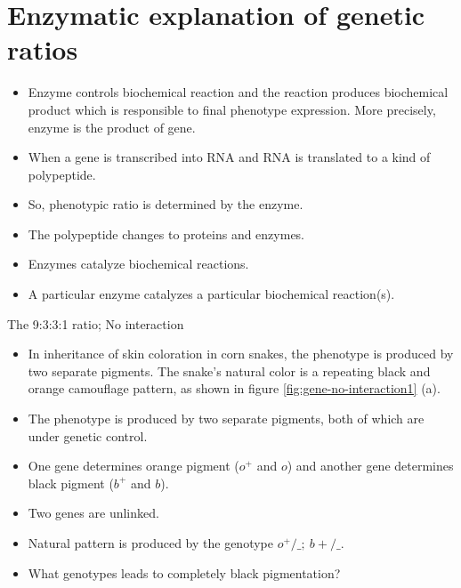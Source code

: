 \documentclass[11pt,dvipsnames,ignorenonframetext,aspectratio=169]{beamer}
\providecommand{\tightlist}{%
  \setlength{\itemsep}{0pt}\setlength{\parskip}{0pt}}
\begin{document}
\hypertarget{enzymatic-explanation-of-genetic-ratios}{%
\section{Enzymatic explanation of genetic
ratios}\label{enzymatic-explanation-of-genetic-ratios}}

\begin{frame}{}
\protect\hypertarget{section-12}{}
\begin{itemize}
\tightlist
\item
  Enzyme controls biochemical reaction and the reaction produces
  biochemical product which is responsible to final phenotype
  expression. More precisely, enzyme is the product of gene.
\item
  When a gene is transcribed into RNA and RNA is translated to a kind of
  polypeptide.
\item
  So, phenotypic ratio is determined by the enzyme.
\item
  The polypeptide changes to proteins and enzymes.
\item
  Enzymes catalyze biochemical reactions.
\item
  A particular enzyme catalyzes a particular biochemical reaction(s).
\end{itemize}
\end{frame}

\begin{frame}{The 9:3:3:1 ratio; No interaction}
\protect\hypertarget{the-9331-ratio-no-interaction}{}
\begin{itemize}
\tightlist
\item
  In inheritance of skin coloration in corn snakes, the phenotype is
  produced by two separate pigments. The snake's natural color is a
  repeating black and orange camouflage pattern, as shown in figure
  \ref{fig:gene-no-interaction1} (a).
\item
  The phenotype is produced by two separate pigments, both of which are
  under genetic control.
\item
  One gene determines orange pigment (\(o^+\) and \(o\)) and another
  gene determines black pigment (\(b^+\) and \(b\)).
\item
  Two genes are unlinked.
\item
  Natural pattern is produced by the genotype \(o^+/\_;\ b+/\_\).
\item
  What genotypes leads to completely black pigmentation?
\end{itemize}
\end{frame}
\end{document}
